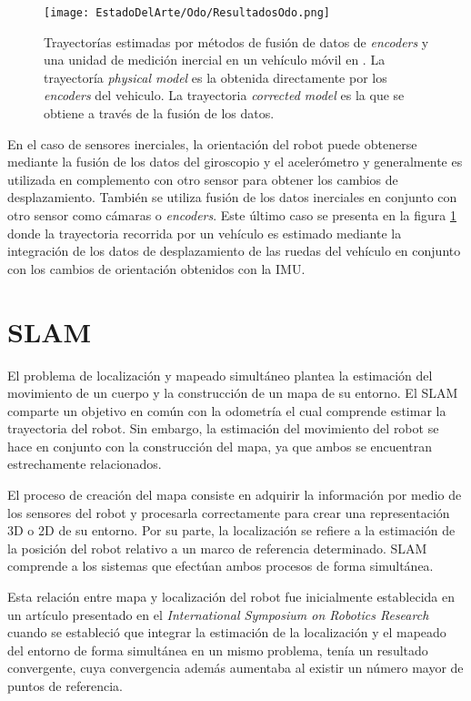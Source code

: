 \begin{figure}[H]
	\centering
	\texttt{[image: EstadoDelArte/Odo/ResultadosOdo.png]}
	\caption[Trayectorías estimadas por métodos de fusión de datos de \textit{encoders} y una unidad de medición inercial en un vehículo móvil en \cite{odo}]{Trayectorías estimadas por métodos de fusión de datos de \textit{encoders} y una unidad de medición inercial en un vehículo móvil en \cite{odo}. La trayectoría \textit{physical model} es la obtenida directamente por los \textit{encoders} del vehiculo. La trayectoria \textit{corrected model} es la que se obtiene a través de la fusión de los datos.}
	\label{fig:OdoEstimacion}
\end{figure}

En el caso de sensores inerciales, la orientación del robot puede obtenerse mediante la fusión de los datos del giroscopio y el acelerómetro y generalmente es utilizada en complemento con otro sensor para obtener los cambios de desplazamiento. También se utiliza fusión de los datos inerciales en conjunto con otro sensor como cámaras o \textit{encoders}. Este último caso se presenta en la figura \ref{fig:OdoEstimacion} donde la trayectoria recorrida por un vehículo es estimado mediante la integración de los datos de desplazamiento de las ruedas del vehículo en conjunto con los cambios de orientación obtenidos con la IMU.

\section{SLAM}

El problema de localización y mapeado simultáneo plantea la estimación del movimiento de un cuerpo y la construcción de un mapa de su entorno. El SLAM comparte un objetivo en común con la odometría el cual comprende estimar la trayectoria del robot. Sin embargo, la estimación  del movimiento del robot se hace en conjunto con la construcción del mapa, ya que ambos se encuentran estrechamente relacionados.

El proceso de creación del mapa consiste en adquirir la información por medio de los sensores del robot y procesarla correctamente para crear una representación 3D o 2D de su entorno. Por su parte, la localización se refiere a la estimación de la posición del robot relativo a un marco de referencia determinado. SLAM comprende a los sistemas que efectúan ambos procesos de forma simultánea.

Esta relación entre mapa  y localización del robot  fue inicialmente establecida en un artículo presentado en el \textit{International Symposium on Robotics Research} \cite{HarrisAndStephens} cuando se estableció que integrar la estimación de la localización y el mapeado del entorno de forma simultánea en un mismo problema, tenía un resultado convergente, cuya convergencia además aumentaba al existir un número mayor de puntos de referencia. 


